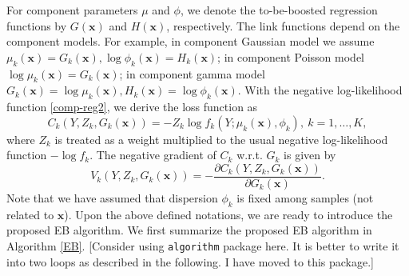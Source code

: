\documentclass[11pt]{article}
\numberwithin{equation}{section}
\def\bx{\boldsymbol{x}}
\newcommand{\blue}[1]{\textcolor{blue}{#1}}
\begin{document}
For component parameters $\mu$ and $\phi$,  we denote the to-be-boosted regression functions by $G(\bx)$ and $H(\bx)$, respectively. 
The link functions depend on the component models.  For example, in component Gaussian model we assume $\mu_k(\bx)=G_k(\bx), \log \phi_k(\bx)=H_k(\bx)$; in component Poisson model $\log\mu_k(\bx)=G_k(\bx)$; in component gamma model $G_k(\bx)=\log \mu_k(\bx), H_k(\bx)=\log \phi_k(\bx).$
With the negative log-likelihood function \eqref{comp-reg2}, we derive the loss function as
	\begin{equation}\label{comp-loss}
		{C_k(Y,Z_k,G_k(\bx))}= -Z_k\log f_k(Y;\mu_k(\bx),\phi_k), ~ k=1,\ldots,K,
	\end{equation}
where $Z_k$ is treated as a weight multiplied to the usual negative log-likelihood function $-\log f_k$.
	The negative gradient of $C_k$ w.r.t. $G_k$ is given by 
\begin{equation}\label{comp-gradient}
{V_k(Y,Z_k,G_k(\bx))}=-\frac{\partial C_k(Y,Z_k,G_k(\bx))}{\partial G_k(\bx)}.
\end{equation}
Note that we have assumed that dispersion $\phi_k$ is fixed among samples (not related to $\bx$). 
Upon the above defined notations, we are ready to introduce the proposed EB algorithm.
We first summarize the proposed EB algorithm in Algorithm \ref{EB}.
{\color{blue}[Consider using {\tt algorithm} package here. It is better to write it into two loops as described in the following. I have moved to this package.]}
\end{document}

